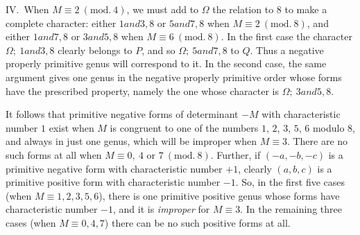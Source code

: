 IV.\ When $M\equiv2\ (\mathrm{mod.}\ 4)$, we must add to $\Omega$ the relation to $8$
to make a complete character: either $1\mathbin{\textit{and}}3,8$ or $5\mathbin{\textit{and}}7,8$ when $M\equiv2\ (\mathrm{mod.}\ 8)$,
and either $1\mathbin{\textit{and}}7,8$ or $3\mathbin{\textit{and}}5,8$ when $M\equiv6\ (\mathrm{mod.}\ 8)$. In the first case the
character $\Omega;\ 1\mathbin{\textit{and}}3,\allowbreak 8$ clearly belongs to $P$, and so $\Omega;\ 5\mathbin{\textit{and}}7,\allowbreak 8$ to
$Q$. Thus a negative properly primitive genus will
correspond to it. In the second case, the same argument gives one genus
in the negative properly primitive order whose forms have the prescribed
property, namely the one whose character is $\Omega;\ 3\mathbin{\textit{and}}5,\allowbreak 8$.

It follows that primitive negative forms of determinant $-M$ with
characteristic number $1$ exist when $M$ is congruent to one
of the numbers $1$, $2$, $3$, $5$, $6$ modulo
$8$, and always in just one genus, which will be improper when
$M\equiv3$. There are no such forms at all when $M\equiv0,\allowbreak \ 4\text{ or }7\ (\mathrm{mod.}\ 8)$. Further, if
$(-a,-b,-c)$ is a primitive negative form with characteristic number
$+1$, clearly $(a,b,c)$ is a primitive positive form with characteristic
number $-1$. So, in the first five cases (when $M\equiv1,2,3,5,6$), there is
one primitive positive genus whose forms have characteristic number
$-1$, and it is \textit{improper} for $M\equiv3$. In the remaining
three cases (when $M\equiv0,4,7$) there can be no such positive forms at all.


